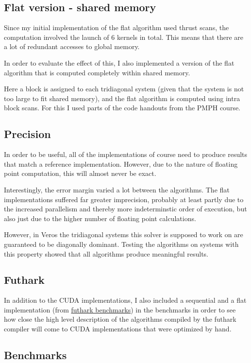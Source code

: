 \documentclass[a4paper,oneside]{memoir}
\begin{document}
\subsection{Flat version - shared memory}
Since my initial implementation of the flat algorithm used thrust scans, the computation involved the launch of 6 kernels in total. This means that there are a lot of redundant accesses to global memory. 

In order to evaluate the effect of this, I also implemented a version of the flat algorithm that is computed completely within shared memory.

Here a block is assigned to each tridiagonal system (given that the system is not too large to fit shared memory), and the flat algorithm is computed using intra block scans. For this I used parts of the code handouts from the PMPH course.


\subsection{Precision}
In order to be useful, all of the implementations of course need to produce results that match a reference implementation. However, due to the nature of floating point computation, this will almost never be exact.

Interestingly, the error margin varied a lot between the algorithms. The flat implementations suffered far greater imprecision, probably at least partly due to the increased parallelism and thereby more indeterminstic order of execution, but also just due to the higher number of floating point calculations.

However, in Veros the tridiagonal systems this solver is supposed to work on are guaranteed to be diagonally dominant. Testing the algorithms on systems with this property showed that all algorithms produce meaningful results.
\subsection{Futhark}
In addition to the CUDA implementations, I also included a sequential and a flat implementation (from \href{https://github.com/diku-dk/futhark-benchmarks/blob/bf5112d0841866dc7370586f2e2a7b48467d2d97/finpar/LocVolCalib.fut}{futhark benchmarks}) in the benchmarks in order to see how close the high level description of the algorithms compiled by the futhark compiler will come to CUDA implementations that were optimized by hand.

\subsection{Benchmarks}
\end{document}
